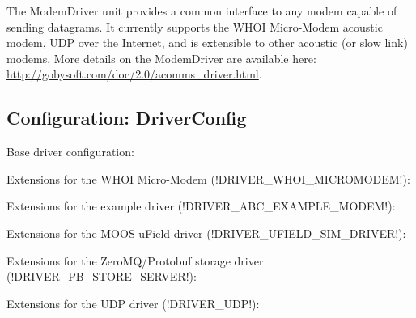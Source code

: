 The ModemDriver unit provides a common interface to any modem capable of sending datagrams. It currently supports the WHOI Micro-Modem acoustic modem, UDP over the Internet, and is extensible to other acoustic (or slow link) modems. More details on the ModemDriver are available here: \url{http://gobysoft.com/doc/2.0/acomms_driver.html}.

\subsection{Configuration: DriverConfig}

Base driver configuration:

\resetbvlinenumber

Extensions for the WHOI Micro-Modem (!DRIVER_WHOI_MICROMODEM!):
\resetbvlinenumber

Extensions for the example driver (!DRIVER_ABC_EXAMPLE_MODEM!):
\resetbvlinenumber

Extensions for the MOOS uField driver (!DRIVER_UFIELD_SIM_DRIVER!):
\resetbvlinenumber

Extensions for the ZeroMQ/Protobuf storage driver (!DRIVER_PB_STORE_SERVER!):
\resetbvlinenumber

Extensions for the UDP driver (!DRIVER_UDP!):
\resetbvlinenumber


\DeleteShortVerb{\!}
